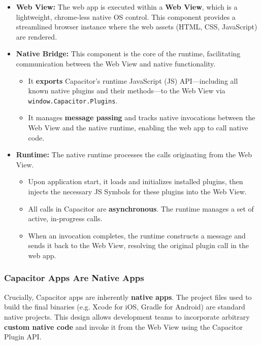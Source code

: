         \begin{itemize}
            \item \textbf{Web View:} The web app is executed within a \textbf{Web View}, which is a lightweight, chrome-less native OS control. This component provides a streamlined browser instance where the web assets (HTML, CSS, JavaScript) are rendered.
            \item \textbf{Native Bridge:} This component is the core of the runtime, facilitating communication between the Web View and native functionality.
                \begin{itemize}
                \item It \textbf{exports} Capacitor's runtime JavaScript (JS) API—including all known native plugins and their methods—to the Web View via\\
                \texttt{window.Capacitor.Plugins}.
                \item It manages \textbf{message passing} and tracks native invocations between the Web View and the native runtime, enabling the web app to call native code.
            \end{itemize}
            \item \textbf{Runtime:} The native runtime processes the calls originating from the Web View.
            \begin{itemize}
                \item Upon application start, it loads and initializes installed plugins, then injects the necessary JS Symbols for these plugins into the Web View.
                \item All calls in Capacitor are \textbf{asynchronous}. The runtime manages a set of active, in-progress calls.
                \item When an invocation completes, the runtime constructs a message and sends it back to the Web View, resolving the original plugin call in the web app.
            \end{itemize}
        \end{itemize}

    \subsubsection*{Capacitor Apps Are Native Apps}

    Crucially, Capacitor apps are inherently \textbf{native apps}. The project files used to build the final binaries (e.g. Xcode for iOS, Gradle for Android) are standard native projects. This design allows development teams to incorporate arbitrary \textbf{custom native code} and invoke it from the Web View using the Capacitor Plugin API.
    
